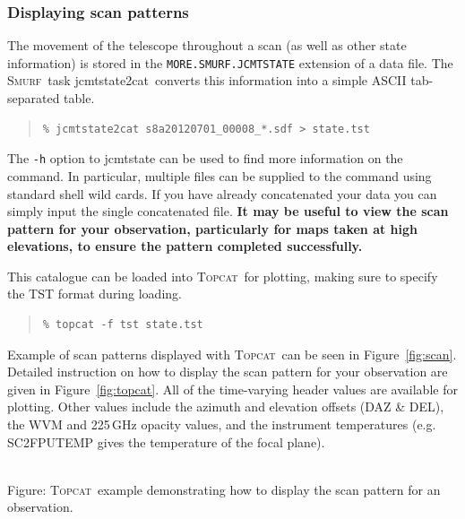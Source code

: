 \documentclass[twoside,11pt]{article}
\newcommand{\htmladdnormallink}[2]{#1}
\newcommand{\htmladdimg}[1]{}
\newcommand{\htmlref}[2]{#1}
\newcommand{\latexhtml}[2]{#1}
\newcommand{\xref}[3]{#1}
\newcommand{\xlabel}[1]{}
\renewcommand{\_}{\texttt{\symbol{95}}}
\newenvironment{myquote}{\begin{quote}\begin{small}}{\end{small}\end{quote}}
\newcommand{\smurf}{\xref{\textsc{Smurf}}{sun258}{}}
\newcommand{\topcat}{\htmladdnormallink{\textsc{Topcat}}{http://www.starlink.ac.uk/topcat}}
\newcommand{\task}[1]{\textsf{#1}}
\newcommand{\jcmtstate}{\xref{\task{jcmtstate2cat}}{sun258}{JCMTSTATE2CAT}}
\newcommand{\cref}[3]{\latexhtml{#1~\ref{#2}}{\htmlref{#3}{#2}}}
\begin{document}
\subsubsection{\xlabel{scan_pat}Displaying scan patterns}
\label{sec:scan}

The movement of the telescope throughout a scan (as well as other
state information) is stored in the \texttt{MORE.SMURF.JCMTSTATE}
extension of a data file. The \smurf\ task \jcmtstate\ converts this
information into a simple ASCII tab-separated table.

\begin{myquote}
\begin{verbatim}
% jcmtstate2cat s8a20120701_00008_*.sdf > state.tst
\end{verbatim}
\end{myquote}

The \texttt{-h} option to \task{jcmtstate} can be used to find more
information on the command. In particular, multiple files can be supplied
to the command using standard shell wild cards. If you have already
concatenated your data you can simply input the single concatenated
file. \textbf{It may be useful to view the scan pattern for your
observation, particularly for maps taken at high elevations, to ensure
the pattern completed successfully.}

This catalogue can be loaded into \topcat\ for plotting, making sure
to specify the TST format during loading.

\begin{myquote}
\begin{verbatim}
% topcat -f tst state.tst
\end{verbatim}
\end{myquote}

Example of scan patterns displayed with \topcat\ can be seen in
\cref{Figure}{fig:scan}{telescope tracks}. Detailed instruction on
how to display the scan pattern for your observation are given in
\cref{Figure}{fig:topcat}{box below}.
All of the time-varying header values are available for plotting.  Other
values include the azimuth and elevation offsets (DAZ \& DEL), the WVM
and 225\,GHz opacity values, and the instrument temperatures (e.g.
SC2\_FPUTEMP gives the temperature of the focal plane).

\begin{htmlonly}
 \label{fig:topcat} \htmladdimg{sc21_topcat_example.png}
 \\
 Figure: \topcat\ example demonstrating how to display the scan
 pattern for an observation.\\ \\
\end{htmlonly}
\end{document}
